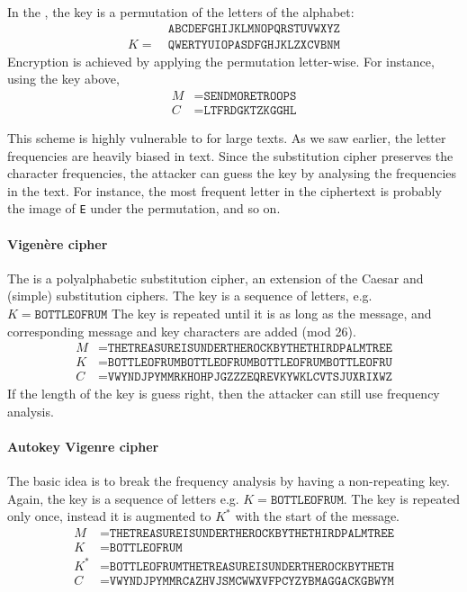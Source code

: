 \documentclass[a4paper, 11pt, openany]{book}
\begin{document}
In the , the key is a permutation of the letters of the alphabet:
\begin{align*}
          &\texttt{ABCDEFGHIJKLMNOPQRSTUVWXYZ}\\
       K = \ &\texttt{QWERTYUIOPASDFGHJKLZXCVBNM}
\end{align*}
Encryption is achieved by applying the permutation letter-wise. For instance, using the key above,
\begin{align*}
    M &= \texttt{SENDMORETROOPS}\\
    C &= \texttt{LTFRDGKTZKGGHL}
\end{align*}

This scheme is highly vulnerable to  for large texts. As we saw earlier, the letter frequencies are heavily biased in text. Since the substitution cipher preserves the character frequencies, the attacker can guess the key by analysing the frequencies in the text. For instance, the most frequent letter in the ciphertext is probably the image of \texttt{E} under the permutation, and so on.




\paragraph{Vigen\`ere cipher}

The  is a polyalphabetic substitution cipher, an extension of the Caesar and (simple) substitution ciphers. The key is a sequence of letters, e.g. $K = \texttt{BOTTLEOFRUM}$
The key is repeated until it is as long as the message, and corresponding message and key characters are added (mod 26).
\begin{align*}
    M &= \texttt{THETREASUREISUNDERTHEROCKBYTHETHIRDPALMTREE}\\
    K &= \texttt{BOTTLEOFRUMBOTTLEOFRUMBOTTLEOFRUMBOTTLEOFRU}\\
    C &= \texttt{VWYNDJPYMMRKHOHPJGZZZEQREVKYWKLCVTSJUXRIXWZ}
\end{align*}
If the length of the key is guess right, then the attacker can still use frequency analysis.



\paragraph{Autokey Vigenre cipher}
The basic idea is to break the frequency analysis by having a non-repeating key. Again, the key is a sequence of letters e.g. $K = \texttt{BOTTLEOFRUM}$. The key is repeated only once, instead it is augmented to $K^*$ with the start of the message.
\begin{align*}
    M &= \texttt{THETREASUREISUNDERTHEROCKBYTHETHIRDPALMTREE}\\
    K &= \texttt{BOTTLEOFRUM}\\
    K^* &= \texttt{BOTTLEOFRUMTHETREASUREISUNDERTHEROCKBYTHETH}\\
    C &= \texttt{VWYNDJPYMMRCAZHVJSMCWWXVFPCYZYBMAGGACKGBWYM}
\end{align*}
\end{document}
